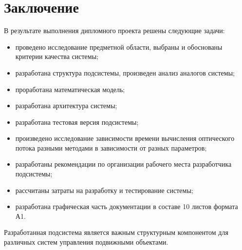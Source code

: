 \newpage
\section*{Заключение}
В результате выполнения дипломного проекта решены следующие задачи:
\begin{itemize}
\item проведено исследование предметной области, выбраны и обоснованы критерии качества системы;
\item разработана структура подсистемы, произведен анализ аналогов системы;
\item проработана математическая модель;
\item разработана архитектура системы;
\item разработана тестовая версия подсистемы;
\item произведено исследование зависимости времени вычисления оптического потока разными методами в зависимости от разных параметров;
\item разработаны рекомендации по организации рабочего места разработчика подсистемы;
\item рассчитаны затраты на разработку и тестирование системы;
\item разработана графическая часть документации в составе 10 листов формата А1.
\end{itemize}
Разработанная подсистема является важным структурным компонентом для различных систем управления подвижными объектами.
